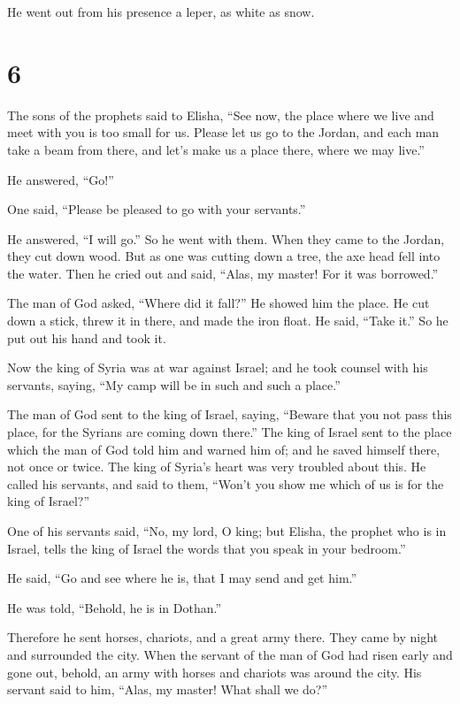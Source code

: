He went out from his presence a leper, as white as snow.

\hypertarget{section-5}{%
\section{6}\label{section-5}}

 The sons of the prophets said to Elisha, ``See now, the
place where we live and meet with you is too small for us.
 Please let us go to the Jordan, and each man take a beam
from there, and let's make us a place there, where we may live.''

He answered, ``Go!''

 One said, ``Please be pleased to go with your servants.''

He answered, ``I will go.''  So he went with them. When
they came to the Jordan, they cut down wood.  But as one
was cutting down a tree, the axe head fell into the water. Then he cried
out and said, ``Alas, my master! For it was borrowed.''

 The man of God asked, ``Where did it fall?'' He showed
him the place. He cut down a stick, threw it in there, and made the iron
float.  He said, ``Take it.'' So he put out his hand and
took it.

 Now the king of Syria was at war against Israel; and he
took counsel with his servants, saying, ``My camp will be in such and
such a place.''

 The man of God sent to the king of Israel, saying,
``Beware that you not pass this place, for the Syrians are coming down
there.''  The king of Israel sent to the place which the
man of God told him and warned him of; and he saved himself there, not
once or twice.  The king of Syria's heart was very
troubled about this. He called his servants, and said to them, ``Won't
you show me which of us is for the king of Israel?''

 One of his servants said, ``No, my lord, O king; but
Elisha, the prophet who is in Israel, tells the king of Israel the words
that you speak in your bedroom.''

 He said, ``Go and see where he is, that I may send and
get him.''

He was told, ``Behold, he is in Dothan.''

 Therefore he sent horses, chariots, and a great army
there. They came by night and surrounded the city.  When
the servant of the man of God had risen early and gone out, behold, an
army with horses and chariots was around the city. His servant said to
him, ``Alas, my master! What shall we do?''

